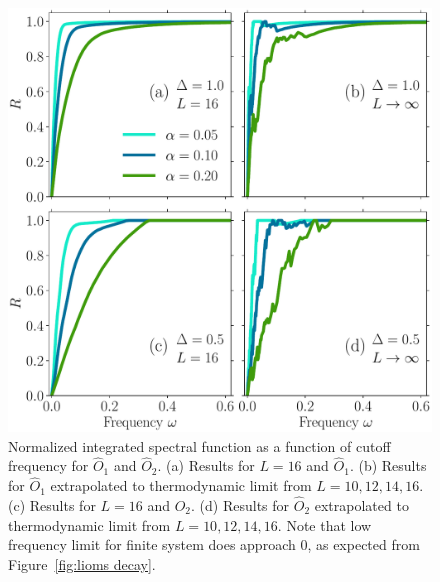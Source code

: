 \begin{figure}[ht]
  \centering
  \includegraphics[width=\figsize\textwidth]{Figures/O12_no_scaling_small.pdf}
  \caption{Normalized integrated spectral function as a function of cutoff frequency for
  \(\hat{O}_1\) and \(\hat{O}_2\).
  (a) Results for \(L=16\) and \(\hat{O}_1\).  (b) Results for \(\hat{O}_1\) extrapolated to
  thermodynamic limit from \(L=10,12,14,16\). (c) Results for \(L=16\) and \(\hat{O}_2\). 
  (d) Results for \(\hat{O}_2\) extrapolated to thermodynamic limit from \(L=10,12,14,16\).
  Note that low frequency limit for finite system does approach \(0\), as expected from 
  Figure~\ref{fig:lioms decay}.
  }\label{fig:O12 no scaling}
\end{figure}
